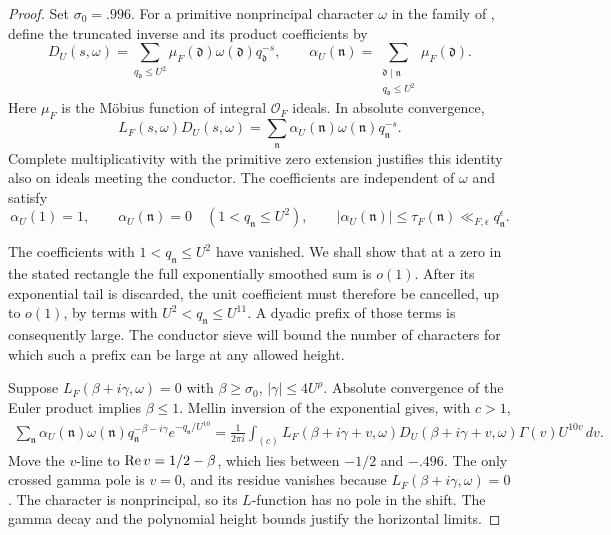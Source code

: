 \begin{proof}
Set \(\sigma_0=.996\).  For a primitive nonprincipal character \(\omega\)
in the family of , define the truncated
inverse and its product coefficients by
\[
 D_U(s,\omega)=\sum_{q_{\mathfrak d}\le U^2}
        \mu_F(\mathfrak d)\omega(\mathfrak d)q_{\mathfrak d}^{-s},
 \qquad
 \alpha_U(\mathfrak n)
    =\sum_{\substack{\mathfrak d\mid\mathfrak n\\q_{\mathfrak d}\le U^2}}
         \mu_F(\mathfrak d).
\]
Here \(\mu_F\) is the Möbius function of integral \(\mathcal O_F\)
ideals.  In absolute convergence,
\[
 L_F(s,\omega)D_U(s,\omega)
       =\sum_{\mathfrak n}\alpha_U(\mathfrak n)
                    \omega(\mathfrak n)q_{\mathfrak n}^{-s}.
\]
Complete multiplicativity with the primitive zero extension justifies
this identity also on ideals meeting the conductor.  The coefficients
are independent of \(\omega\) and satisfy
\begin{equation}
 \alpha_U(1)=1,\qquad
 \alpha_U(\mathfrak n)=0\quad(1<q_{\mathfrak n}\le U^2),\qquad
 |\alpha_U(\mathfrak n)|\le\tau_F(\mathfrak n)
                 \ll_{F,\epsilon}q_{\mathfrak n}^\epsilon.
\label{eq:detector-coefficients}
\end{equation}

The coefficients with \(1<q_{\mathfrak n}\le U^2\) have vanished.
We shall show that at a zero in the stated rectangle the full
exponentially smoothed sum is \(o(1)\).  After its exponential tail is
discarded, the unit coefficient must therefore be cancelled, up to \(o(1)\),
by terms with
\(U^2<q_{\mathfrak n}\le U^{11}\).  A dyadic prefix of those terms is
consequently large.  The conductor sieve will bound the number of
characters for which such a prefix can be large at any allowed height.

Suppose \(L_F(\beta+i\gamma,\omega)=0\) with
\(\beta\ge\sigma_0\), \(|\gamma|\le4U^\rho\).  Absolute convergence of
the Euler product implies \(\beta\le1\).  Mellin inversion of the
exponential gives, with \(c>1\),
\begin{equation}
 \begin{split}
 \sum_{\mathfrak n}\alpha_U(\mathfrak n)\omega(\mathfrak n)
       q_{\mathfrak n}^{-\beta-i\gamma}e^{-q_{\mathfrak n}/U^{10}}
   =\frac1{2\pi i}\int_{(c)}
   L_F(\beta+i\gamma+v,\omega)D_U(\beta+i\gamma+v,\omega)
          \Gamma(v)U^{10v}\,dv .
 \end{split}
\label{eq:zero-detector}
\end{equation}
Move the \(v\)-line to \(\operatorname{Re} v=1/2-\beta\), which lies between
\(-1/2\) and \(-.496\).  The only crossed gamma pole is \(v=0\), and
its residue vanishes because \(L_F(\beta+i\gamma,\omega)=0\).
The character is nonprincipal, so its \(L\)-function has no pole in the
shift.  The gamma decay and the polynomial height bounds justify the
horizontal limits.


\end{proof}
